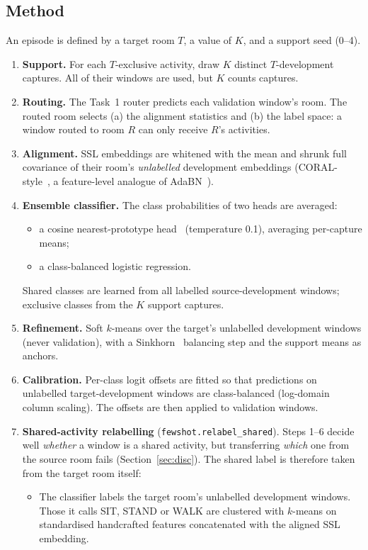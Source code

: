 \documentclass[11pt,a4paper]{article}
\begin{document}
\subsection{Method}
An episode is defined by a target room $T$, a value of $K$, and a support seed (0--4).
\begin{enumerate}
  \item \textbf{Support.} For each $T$-exclusive activity, draw $K$ distinct $T$-development captures. All of their windows are used, but $K$ counts captures.
  \item \textbf{Routing.} The Task~1 router predicts each validation window's room. The routed room selects (a) the alignment statistics and (b) the label space: a window routed to room $R$ can only receive $R$'s activities.
  \item \textbf{Alignment.} SSL embeddings are whitened with the mean and shrunk full covariance of their room's \emph{unlabelled} development embeddings (CORAL-style~\cite{coral}, a feature-level analogue of AdaBN~\cite{adabn}).
  \item \textbf{Ensemble classifier.} The class probabilities of two heads are averaged:
  \begin{itemize}
    \item a cosine nearest-prototype head~\cite{protonet} (temperature 0.1), averaging per-capture means;
    \item a class-balanced logistic regression.
  \end{itemize}
  Shared classes are learned from all labelled source-development windows; exclusive classes from the $K$ support captures.
  \item \textbf{Refinement.} Soft $k$-means over the target's unlabelled development windows (never validation), with a Sinkhorn~\cite{sinkhorn} balancing step and the support means as anchors.
  \item \textbf{Calibration.} Per-class logit offsets are fitted so that predictions on unlabelled target-development windows are class-balanced (log-domain column scaling). The offsets are then applied to validation windows.
  \item \textbf{Shared-activity relabelling} (\texttt{fewshot.relabel\_shared}). Steps 1--6 decide well \emph{whether} a window is a shared activity, but transferring \emph{which} one from the source room fails (Section~\ref{sec:disc}). The shared label is therefore taken from the target room itself:
  \begin{itemize}
    \item The classifier labels the target room's unlabelled development windows. Those it calls SIT, STAND or WALK are clustered with $k$-means on standardised handcrafted features concatenated with the aligned SSL embedding.

\end{itemize}
\end{enumerate}
\end{document}
